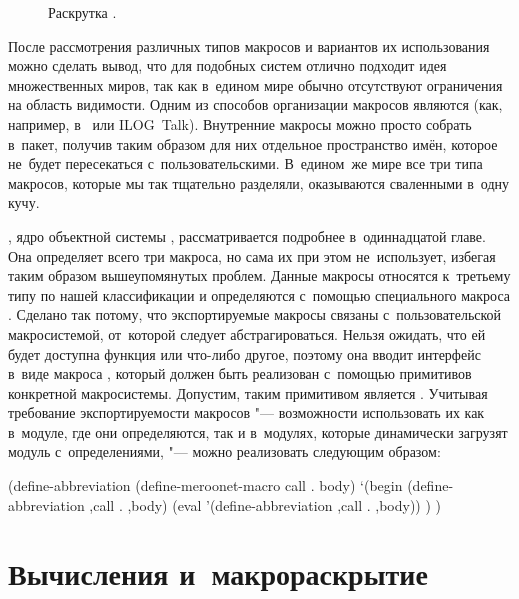 \begin{figure}\centering

\caption{Раскрутка \protect\Meroon.}
\label{macros/scope/pic:bootstrap}
\end{figure}

После рассмотрения различных типов макросов и вариантов их использования можно
сделать вывод, что для подобных систем отлично подходит идея множественных
миров, так как в~едином мире обычно отсутствуют ограничения на область
видимости. Одним из способов организации макросов являются  (как,
например, в~{\CommonLisp} или ILOG~Talk). Внутренние макросы можно просто
собрать в~пакет, получив таким образом для них отдельное пространство имён,
которое не~будет пересекаться с~пользовательскими. В~едином~же мире все три
типа макросов, которые мы так тщательно разделяли, оказываются сваленными в~одну
кучу.

{\Meroonet}, ядро объектной системы {\Meroon}, рассматривается подробнее
в~одиннадцатой главе. Она определяет всего три макроса, но сама их при этом
не~использует, избегая таким образом вышеупомянутых проблем. Данные макросы
относятся к~третьему типу по нашей классификации и определяются с~помощью
специального макроса . Сделано так потому, что
экспортируемые макросы связаны с~пользовательской макросистемой, от~которой
{\Meroonet} следует абстрагироваться. Нельзя ожидать, что ей будет доступна
функция  или что-либо другое, поэтому она вводит интерфейс
в~виде макроса , который должен быть реализован
с~помощью примитивов конкретной макросистемы. Допустим, таким примитивом
является . Учитывая требование экспортируемости макросов
"--- возможности использовать их как в~модуле, где они определяются, так и
в~модулях, которые динамически загрузят модуль с~определениями, "---
 можно реализовать следующим образом:

\begin{code:lisp}
(define-abbreviation (define-meroonet-macro call . body)
  `(begin (define-abbreviation ,call . ,body)
          (eval '(define-abbreviation ,call . ,body)) ) )
\end{code:lisp}


\section{Вычисления и~макрораскрытие}\label{macros/sect:eval-and-expand}

